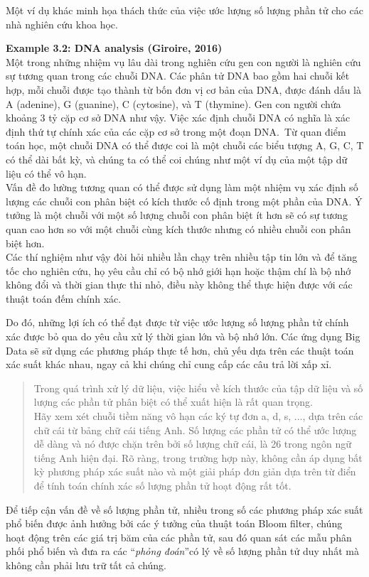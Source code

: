 \documentclass[a4paper,13pt]{article}
\theoremstyle{mytheor}
\begin{document}
\break
Một ví dụ khác minh họa thách thức của việc ước lượng số lượng phần tử 
cho các nhà nghiên cứu khoa học.
\begin{mdframed}
    \textbf{Example 3.2: DNA analysis (Giroire, 2016)}\\
    Một trong những nhiệm vụ lâu dài trong nghiên cứu gen con người là nghiên cứu sự tương quan trong các chuỗi DNA. Các phân tử DNA 
    bao gồm hai chuỗi kết hợp, mỗi chuỗi được tạo thành từ bốn đơn vị cơ bản của DNA, được đánh dấu là A (adenine), G (guanine), C (cytosine), và T (thymine). Gen con người chứa khoảng 3 tỷ cặp cơ sở DNA như vậy. Việc xác định chuỗi DNA có nghĩa là xác định thứ tự chính xác của các cặp cơ sở trong một đoạn DNA.\
    Từ quan điểm toán học, một chuỗi DNA có thể được coi là một chuỗi các biểu tượng A, G, C, T có thể dài bất kỳ, và chúng ta có thể coi chúng như 
    một ví dụ của một tập dữ liệu có thể vô hạn.\\
    Vấn đề đo lường tương quan có thể được sử dụng làm một nhiệm vụ xác định số lượng các chuỗi con phân biệt có kích thước cố định trong một phần của DNA. 
    Ý tưởng là một chuỗi với một số lượng chuỗi con phân biệt ít hơn sẽ có sự tương quan cao hơn so với một chuỗi cùng kích thước nhưng có nhiều chuỗi con 
    phân biệt hơn.\\
    Các thí nghiệm như vậy đòi hỏi nhiều lần chạy trên nhiều tập tin lớn và để tăng tốc cho nghiên cứu, họ yêu cầu chỉ có bộ nhớ giới hạn hoặc thậm chí 
    là bộ nhớ không đổi và thời gian thực thi nhỏ, điều này không thể thực hiện được với các thuật toán đếm chính xác.
\end{mdframed}
Do đó, những lợi ích có thể đạt được từ việc ước lượng số lượng phần tử chính xác được bỏ qua do yêu cầu xử lý thời gian lớn và bộ nhớ lớn. 
Các ứng dụng Big Data sẽ sử dụng các phương pháp thực tế hơn, chủ yếu dựa trên các thuật toán xác suất khác nhau, ngay cả khi chúng chỉ cung cấp 
các câu trả lời xấp xỉ.\\
\vspace{0.5cm}
\begin{quote}
    Trong quá trình xử lý dữ liệu, việc hiểu về kích thước của tập dữ liệu và số lượng các phần tử phân biệt có thể xuất hiện là rất quan trọng.\\
    Hãy xem xét chuỗi tiềm năng vô hạn các ký tự đơn a, d, s, ..., dựa trên các chữ cái từ bảng chữ cái tiếng Anh. 
    Số lượng các phần tử có thể ước lượng dễ dàng và nó được chặn trên bởi số lượng chữ cái, là 26 trong ngôn ngữ tiếng Anh hiện đại. 
    Rõ ràng, trong trường hợp này, không cần áp dụng bất kỳ phương pháp xác suất nào và một giải pháp đơn giản dựa trên từ điển để tính toán chính xác 
    số lượng phần tử hoạt động rất tốt.\\
\end{quote}
\indent Để tiếp cận vấn đề về số lượng phần tử, nhiều trong số các phương pháp xác suất phổ biến được ảnh hưởng bởi các ý tưởng của thuật toán Bloom filter, 
chúng hoạt động trên các giá trị băm của các phần tử, sau đó quan sát các mẫu phân phối phổ biến và đưa ra các \textquotedblleft\textit{phỏng đoán}\textquotedblright có lý về số lượng 
phần tử duy nhất mà không cần phải lưu trữ tất cả chúng.
\end{document}
